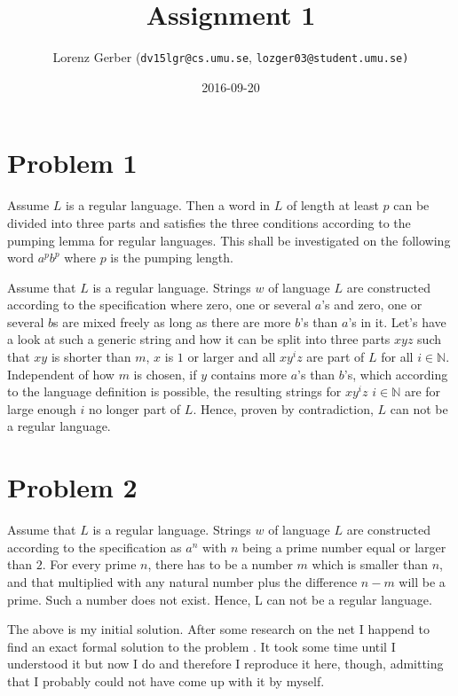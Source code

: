 \documentclass[a4paper,11pt,twoside]{article}
\title{Assignment 1}
\author{Lorenz Gerber ({\tt{dv15lgr@cs.umu.se}}, {\tt{lozger03@student.umu.se})}}
\date{2016-09-20}
\begin{document}
\lstset{language=C}
\maketitle
\thispagestyle{empty}
\newpage

\clearpage
{}

\section*{Problem 1}
Assume $L$ is a regular language. Then a word in $L$ of length at least $p$ can be divided into three parts and satisfies the three conditions according to the pumping lemma for regular languages. This shall be investigated on the following word $a^{p}b^{p}$ where $p$ is the pumping length.




Assume that $L$ is a regular language. Strings $w$ of language $L$ are constructed according to the specification where zero, one or several $a$'s and zero, one or several $b$s are mixed freely as long as there are more $b$'s than $a$'s in it. Let's have a look at such a generic string and how it can be split into three parts $xyz$ such that $xy$ is shorter than $m$, $x$ is $1$ or larger and all $xy^{i}z$ are part of $L$ for all $i \in \mathbb{N}$. Independent of how $m$ is chosen, if $y$ contains more $a$'s than $b$'s, which according to the language definition is possible,  the resulting strings for $xy^{i}z$ $i \in \mathbb{N}$  are for large enough $i$ no longer part of $L$. Hence, proven by contradiction, $L$ can not be a regular language. 

\section*{Problem 2}
Assume that $L$ is a regular language. Strings $w$ of language $L$ are constructed according to the specification as $a^n$ with $n$ being a prime number equal or larger than $2$. For every prime $n$, there has to be a number $m$ which is smaller than $n$, and that multiplied with any natural number plus the difference $n - m$ will be a prime. Such a number does not exist. Hence, L can not be a regular language. 

The above is my initial solution. After some research on the net I
happend to find an exact formal solution to the problem \cite{pumpprime}. It took some
time until I understood it but now I do and therefore I reproduce it
here, though,  admitting that I probably could not have come up with it by
myself. 
 
\end{document}
